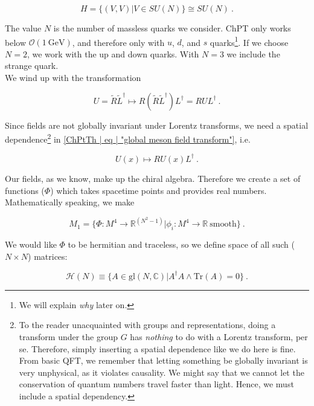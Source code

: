\documentclass[10pt,twoside]{report}
\begin{document}
	\begin{equation}
	H = \{(V,V)|V\in SU(N)\} \cong SU(N) \:.
	\end{equation}
	
	The value $N$ is the number of massless quarks we consider. ChPT only works below $\mathcal{O}(1\:\text{GeV})$, and therefore only with $u$, $d$, and $s$ quarks\footnote{We will explain \emph{why} later on.}. If we choose $N=2$, we work with the up and down quarks. With $N=3$ we include the strange quark.\\
	
	We wind up with the transformation
	
	\begin{equation}
		U = \tilde{R}\tilde{L}^\dagger \mapsto R(\tilde{R}\tilde{L}^\dagger)L^\dagger = RUL^\dagger \:.
		\label{ChPtTh | eq | "global meson field transform"}
	\end{equation}
	
	Since fields are not globally invariant under Lorentz transforms, we need a spatial dependence\footnote{To the reader unacquainted with groups and representations, doing a transform under the group $G$ has \emph{nothing} to do with a Lorentz transform, per se. Therefore, simply inserting a spatial dependence like we do here is fine. From basic QFT, we remember that letting something be globally invariant is very unphysical, as it violates causality. We might say that we cannot let the conservation of quantum numbers travel faster than light. Hence, we must include a spatial dependency.} in \ref{ChPtTh | eq | "global meson field transform"}, i.e.
	
	\begin{equation}
		U(x) \mapsto  RU(x)L^\dagger \:.
	\end{equation}
	
	Our fields, as we know, make up the chiral algebra. Therefore we create a set of functions ($\Phi$) which takes spacetime points and provides real numbers. Mathematically speaking, we make
	
	\begin{equation}
		M_1 = \{\Phi:M^4\rightarrow \mathbb{R}^{(N^2 - 1)}|\phi_i:M^4\rightarrow\mathbb{R}\:\text{smooth}\} \:.
	\end{equation}
	
	We would like $\Phi$ to be hermitian and traceless, so we define space of all such ($N\times N$) matrices:
	
	\begin{equation}
		\mathcal{H}(N) \equiv \{A\in \text{gl}(N,\mathbb{C})|A^\dagger A\wedge \text{Tr}(A)=0\} \:.
	\end{equation}
	
\end{document}
